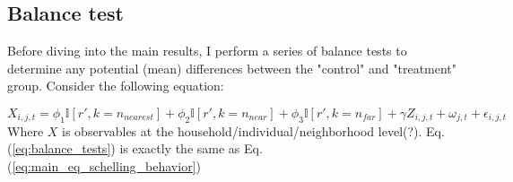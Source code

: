 \documentclass[main.tex]{subfiles}
\begin{document}
\subsection{Balance test}

Before diving into the main results, I perform a series of balance tests to determine any potential (mean) differences between the "control" and "treatment" group. Consider the following equation:

\begin{equation}
    X_{i, j, t} = \phi_1 \mathbb{I}[r', k=n_{nearest}] + \phi_2 \mathbb{I}[r', k = n_{near}] + \phi_3 \mathbb{I}[r', k = n_{far}] + \gamma Z_{i, j, t} + \omega_{j, t} + \epsilon_{i, j, t} 
    \label{eq:balance_tests}
\end{equation}
Where $X$ is observables at the household/individual/neighborhood level(?). Eq. (\ref{eq:balance_tests}) is exactly the same as Eq. (\ref{eq:main_eq_schelling_behavior})
\end{document}
